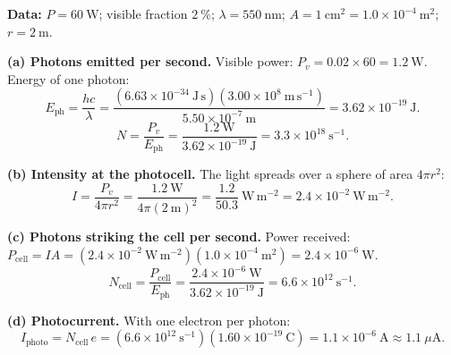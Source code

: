 \documentclass[11pt]{article}
\begin{document}
\begin{corrige}
\textbf{Data:} $P = 60\ \mathrm{W}$; visible fraction $2\ \%$; $\lambda = 550\ \mathrm{nm}$; $A = 1\ \mathrm{cm}^2 = 1.0\times 10^{-4}\ \mathrm{m}^2$; $r = 2\ \mathrm{m}$.

\textbf{(a) Photons emitted per second.} Visible power: $P_v = 0.02 \times 60 = 1.2\ \mathrm{W}$. Energy of one photon:
\[ E_{\text{ph}} = \frac{hc}{\lambda} = \frac{(6.63\times 10^{-34}\ \mathrm{J\,s})(3.00\times 10^{8}\ \mathrm{m\,s^{-1}})}{5.50\times 10^{-7}\ \mathrm{m}} = 3.62\times 10^{-19}\ \mathrm{J}. \]
\[ N = \frac{P_v}{E_{\text{ph}}} = \frac{1.2\ \mathrm{W}}{3.62\times 10^{-19}\ \mathrm{J}} = 3.3\times 10^{18}\ \mathrm{s^{-1}}. \]

\textbf{(b) Intensity at the photocell.} The light spreads over a sphere of area $4\pi r^2$:
\[ I = \frac{P_v}{4\pi r^2} = \frac{1.2\ \mathrm{W}}{4\pi (2\ \mathrm{m})^2} = \frac{1.2}{50.3}\ \mathrm{W\,m^{-2}} = 2.4\times 10^{-2}\ \mathrm{W\,m^{-2}}. \]

\textbf{(c) Photons striking the cell per second.} Power received: $P_{\text{cell}} = IA = (2.4\times 10^{-2}\ \mathrm{W\,m^{-2}})(1.0\times 10^{-4}\ \mathrm{m}^2) = 2.4\times 10^{-6}\ \mathrm{W}$.
\[ N_{\text{cell}} = \frac{P_{\text{cell}}}{E_{\text{ph}}} = \frac{2.4\times 10^{-6}\ \mathrm{W}}{3.62\times 10^{-19}\ \mathrm{J}} = 6.6\times 10^{12}\ \mathrm{s^{-1}}. \]

\textbf{(d) Photocurrent.} With one electron per photon:
\[ I_{\text{photo}} = N_{\text{cell}}\, e = (6.6\times 10^{12}\ \mathrm{s^{-1}})(1.60\times 10^{-19}\ \mathrm{C}) = 1.1\times 10^{-6}\ \mathrm{A} \approx 1.1\ \mu\mathrm{A}. \]
\end{corrige}
\end{document}
